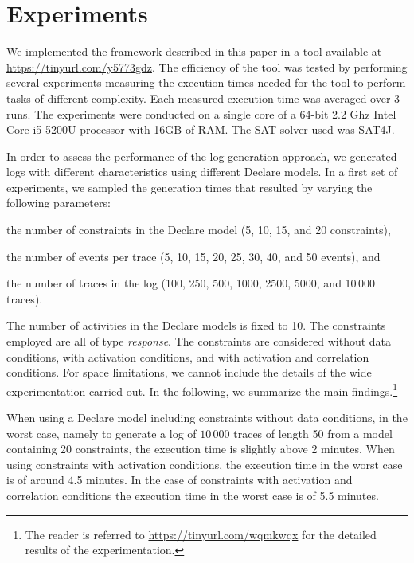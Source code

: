 \section{Experiments}
We implemented the framework described in this paper in a tool available at \url{https://tinyurl.com/y5773gdz}. The efficiency of the tool was tested by performing several experiments measuring the execution times needed for the tool to perform tasks of different complexity.
Each measured execution time was averaged over 3 runs. The experiments were conducted on a single core of a 64-bit 2.2 Ghz Intel Core i5-5200U processor with 16GB of RAM. The SAT solver used was SAT4J.

In order to assess the performance of the log generation approach, we generated logs with different characteristics using different Declare models.
In a first set of experiments, we sampled the generation times that resulted by varying the following parameters:
\begin{inparaenum}
\item the number of constraints in the Declare model (5, 10, 15, and 20 constraints),
\item the number of events per trace (5, 10, 15, 20, 25, 30, 40, and 50 events), and
\item the number of traces in the log (100, 250, 500, 1000, 2500, 5000, and 10\,000 traces).
\end{inparaenum}
The number of activities in the Declare models is fixed to 10. The constraints employed are all of type \emph{response}. The constraints are considered without data conditions, with activation conditions, and with activation and correlation conditions. 
For space limitations, we cannot include the details of the wide experimentation carried out. In the following, we summarize the main findings.\footnote{The reader is referred to \url{https://tinyurl.com/wqmkwqx} for the detailed results of the experimentation.}

%
%
%
%
%
%
%


When using a Declare model including constraints without data conditions, in the worst case, namely to generate a log of $10\,000$ traces of length 50 from a model containing 20 constraints, the execution time is slightly above 2 minutes. When using constraints with activation conditions, the execution time in the worst case is of around 4.5 minutes. In the case of constraints with activation and correlation conditions the execution time in the worst case is of 5.5 minutes.

